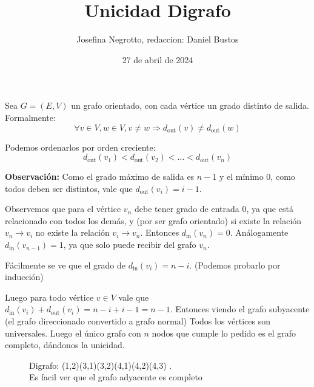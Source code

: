 \documentclass{article}
\title{Unicidad Digrafo}
\author{Josefina Negrotto, redaccion: Daniel Bustos}
\date{27 de abril de 2024}
\begin{document}
\maketitle

Sea $G = (E,V)$ un grafo orientado, con cada vértice un grado distinto de salida. Formalmente:
\[
\forall v \in V, w \in V, v \neq w \Rightarrow d_{\text{out}}(v) \neq d_{\text{out}}(w)
\]

Podemos ordenarlos por orden creciente:
\[
d_{\text{out}}(v_1) < d_{\text{out}}(v_2) < \ldots < d_{\text{out}}(v_n)
\]

\textbf{Observación:} Como el grado máximo de salida es $n - 1$ y el mínimo 0, como todos deben ser distintos, vale que $d_{\text{out}}(v_i) = i - 1$.

Observemos que para el vértice $v_n$ debe tener grado de entrada 0, ya que está relacionado con todos los demás, y (por ser grafo orientado) si existe la relación $v_n \to v_i$ no existe la relación $v_i \to v_n$. Entonces $d_{\text{in}}(v_n) = 0$. Análogamente $d_{\text{in}}(v_{n-1}) = 1$, ya que solo puede recibir del grafo $v_n$.

Fácilmente se ve que el grado de $d_{\text{in}}(v_i) = n - i$. (Podemos probarlo por inducción)

Luego para todo vértice $v \in V$ vale que $d_{\text{in}}(v_i) + d_{\text{out}}(v_i) = n - i + i - 1 = n - 1$. Entonces viendo el grafo subyacente (el grafo direccionado convertido a grafo normal) Todos los vértices son universales. Luego el único grafo con $n$ nodos que cumple lo pedido es el grafo completo, dándonos la unicidad.

\begin{figure}[h]
\centering
{}
\caption{Digrafo: (1,2)(3,1)(3,2)(4,1)(4,2)(4,3) .\\ 
        Es facil ver que el grafo adyacente es completo}
\end{figure}
\end{document}
